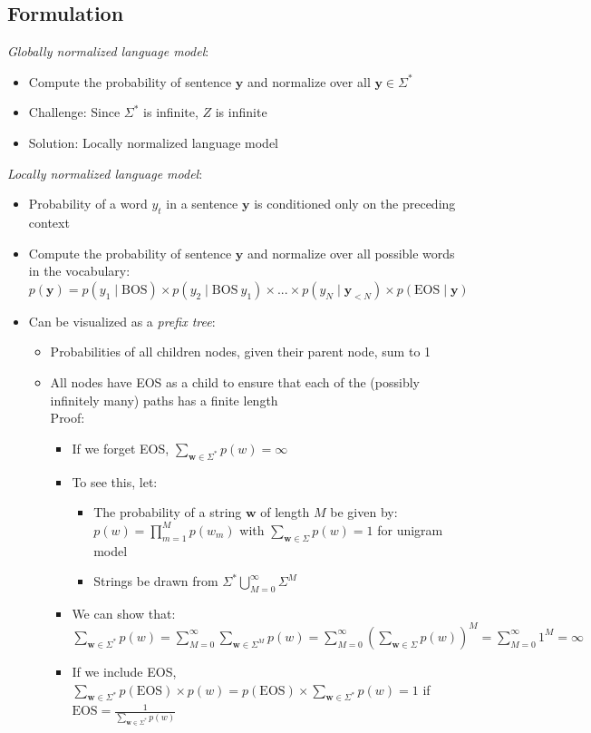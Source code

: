 \subsection*{Formulation}
\emph{Globally normalized language model}:
\begin{itemize}
    \item Compute the probability of sentence $\boldsymbol{y}$ and normalize over all $\boldsymbol{y} \in \Sigma^*$
    \item Challenge: Since $\Sigma^*$ is infinite, $Z$ is infinite
    \item Solution: Locally normalized language model
\end{itemize}
\emph{Locally normalized language model}:
\begin{itemize}
    \item Probability of a word $y_t$ in a sentence $\boldsymbol{y}$ is conditioned only on the preceding context
    \item Compute the probability of sentence $\boldsymbol{y}$ and normalize over all possible words in the vocabulary:
    $
    p(\boldsymbol{y}) = p(y_1 \mid \textrm{BOS}) \times p(y_2 \mid  \textrm{BOS} \ y_1) \times ... \times p(y_N \mid \boldsymbol{y}_{<N}) \times p(\textrm{EOS} \mid \boldsymbol{y})
    $
    \item Can be visualized as a \emph{prefix tree}:
    \begin{itemize}
        \item Probabilities of all children nodes, given their parent node, sum to 1
        \item All nodes have EOS as a child to ensure that each of the (possibly infinitely many) paths has a finite length\\
        Proof:
        \begin{itemize}
            \item If we forget EOS, $\sum_{\boldsymbol{w} \in \Sigma^*} p(w) = \infty$
            \item To see this, let:
            \begin{itemize}
                \item The probability of a string $\boldsymbol{w}$ of length $M$ be given by: $p(w) = \prod_{m=1}^M p(w_m)$ with $\sum_{\boldsymbol{w} \in \Sigma} p(w) = 1$ for unigram model
                \item Strings be drawn from $\Sigma^* \bigcup_{M=0}^\infty \Sigma^M$
            \end{itemize}
            \item We can show that: $\sum_{\boldsymbol{w} \in \Sigma^*} p(w) = \sum_{M=0}^\infty \sum_{\boldsymbol{w} \in \Sigma^M} p(w) = \sum_{M=0}^\infty (\sum_{\boldsymbol{w} \in \Sigma} p(w))^M = \sum_{M=0}^\infty 1^M = \infty$
            \item If we include EOS, $\sum_{\boldsymbol{w} \in \Sigma^*} p(\textrm{EOS}) \times p(w) = p(\textrm{EOS}) \times \sum_{\boldsymbol{w} \in \Sigma^*} p(w) = 1$ if $\textrm{EOS} = \frac{1}{\sum_{\boldsymbol{w} \in \Sigma^*} p(w)}$
        \end{itemize}
    \end{itemize}
\end{itemize}
